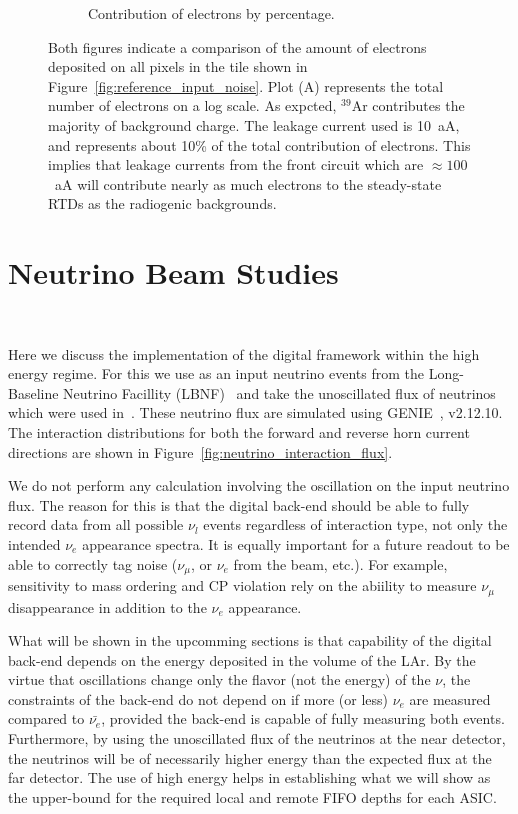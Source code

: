 \begin{figure}
\begin{subfigure}{.5\textwidth}
  \caption{Contribution of electrons by percentage.}
\end{subfigure}
\caption{Both figures indicate a comparison of the amount of electrons deposited on all pixels in the tile shown in Figure~\ref{fig:reference_input_noise}.
Plot (A) represents the total number of electrons on a log scale.
As expcted, $^{39}$Ar contributes the majority of background charge.
The leakage current used is 10~\unit{aA}, and represents about 10\% of the total contribution of electrons.
This implies that leakage currents from the front circuit which are $\approx 100$~\unit{aA} will contribute nearly as much electrons to the steady-state RTDs as the radiogenic backgrounds.
}
\label{fig:compare_electron_contribution}
\end{figure}

\section{Neutrino Beam Studies}~\label{sec:neutrino_studies}

Here we discuss the implementation of the digital framework within the high energy regime.
For this we use as an input neutrino events from the Long-Baseline Neutrino Facillity (LBNF)~\citep{dune_cdr_2016_arxiv} and take the unoscillated flux of neutrinos which were used in~\citep{dune_2021_near_detector_cdr}.
These neutrino flux are simulated using GENIE~\citep{Andreopoulos:2009rq}, v2.12.10.
The interaction distributions for both the forward and reverse horn current directions are shown in Figure~\ref{fig:neutrino_interaction_flux}.

We do not perform any calculation involving the oscillation on the input neutrino flux.
The reason for this is that the digital back-end should be able to fully record data from all possible $\nu_{l}$ events regardless of interaction type, not only the intended $\nu_{e}$ appearance spectra.
It is equally important for a future readout to be able to correctly tag noise ($\nu_{\mu}$, or $\nu_{e}$ from the beam, etc.).
For example, sensitivity to mass ordering and CP violation rely on the abiility to measure $\nu_{\mu}$ disappearance in addition to the $\nu_{e}$ appearance.

What will be shown in the upcomming sections is that capability of the digital back-end depends on the energy deposited in the volume of the LAr.
By the virtue that oscillations change only the flavor (not the energy) of the $\nu$, the constraints of the back-end do not depend on if more (or less) $\nu_{e}$ are measured compared to $\bar{\nu_{e}}$, provided the back-end is capable of fully measuring both events.
Furthermore, by using the unoscillated flux of the neutrinos at the near detector, the neutrinos will be of necessarily higher energy than the expected flux at the far detector.
The use of high energy helps in establishing what we will show as the upper-bound for the required local and remote FIFO depths for each ASIC.


